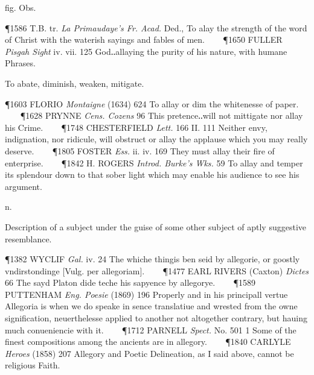 \begin{description}[wide, labelwidth=!, labelindent=0pt]
\begin{myenumerate}
 fig. Obs. 

\P 1586 T.B. tr. \textit{La Primaudaye's Fr. Acad.} Ded., To alay the strength of the word of Christ with the waterish sayings and fables of men.    
\P 1650 FULLER \textit{Pisgah Sight} iv. vii. 125 God‥allaying the purity of his nature, with humane Phrases.

 To abate, diminish, weaken, mitigate. 

\P 1603 FLORIO \textit{Montaigne} (1634) 624 To allay or dim the whitenesse of paper.    
\P 1628 PRYNNE \textit{Cens. Cozens} 96 This pretence‥will not mittigate nor allay his Crime.    
\P 1748 CHESTERFIELD \textit{Lett.} 166 II. 111 Neither envy, indignation, nor ridicule, will obstruct or allay the applause which you may really deserve.    
\P 1805 FOSTER \textit{Ess.} ii. iv. 169 They must allay their fire of enterprise.    
\P 1842 H. ROGERS \textit{Introd. Burke's Wks.} 59 To allay and temper its splendour down to that sober light which may enable his audience to see his argument.
\end{myenumerate}

  n.

\noindent  {}

\vspace{-0.3cm}

\begin{myenumerate}
 Description of a subject under the guise of some other subject of aptly
suggestive resemblance. 

\P 1382 WYCLIF \textit{Gal.} iv. 24 The whiche thingis ben seid by allegorie, or goostly
vndirstondinge [Vulg. per allegoriam].    
\P 1477 EARL RIVERS (Caxton) \textit{Dictes} 66 The sayd Platon dide teche his sapyence by allegorye.    
\P 1589 PUTTENHAM \textit{Eng. Poesie} (1869) 196 Properly and in his principall vertue Allegoria is when we do
speake in sence translatiue and wrested from the owne signification,
neuerthelesse applied to another not altogether contrary, but hauing much
conueniencie with it.    
\P 1712 PARNELL \textit{Spect.} No. 501 1 Some of the finest
compositions among the ancients are in allegory.    
\P 1840 CARLYLE \textit{Heroes} (1858)
207 Allegory and Poetic Delineation, as I said above, cannot be religious Faith.


\end{myenumerate}
\end{description}

